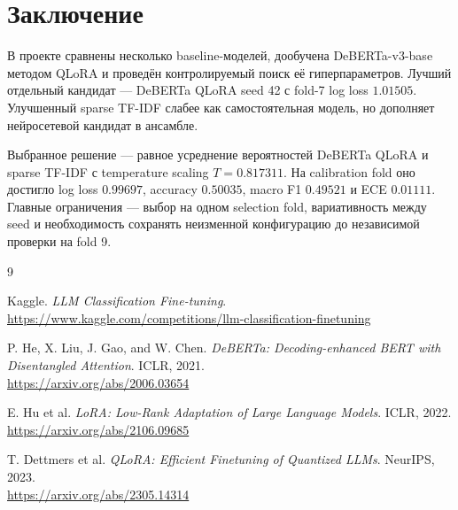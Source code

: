\documentclass[a4paper,11pt]{article}
\begin{document}
\section{Заключение}

В проекте сравнены несколько baseline-моделей, дообучена DeBERTa-v3-base
методом QLoRA и проведён контролируемый поиск её гиперпараметров. Лучший
отдельный кандидат --- DeBERTa QLoRA seed 42 с fold-7 log loss $1.01505$.
Улучшенный sparse TF-IDF слабее как самостоятельная модель, но дополняет
нейросетевой кандидат в ансамбле.

Выбранное решение --- равное усреднение вероятностей DeBERTa QLoRA и sparse
TF-IDF с temperature scaling $T=0.817311$. На calibration fold оно достигло
log loss $0.99697$, accuracy $0.50035$, macro F1 $0.49521$ и ECE $0.01111$.
Главные ограничения --- выбор на одном selection fold, вариативность между
seed и необходимость сохранять неизменной конфигурацию до независимой
проверки на fold 9.

\begin{thebibliography}{9}

Kaggle. \emph{LLM Classification Fine-tuning}.\\
\url{https://www.kaggle.com/competitions/llm-classification-finetuning}

P. He, X. Liu, J. Gao, and W. Chen. \emph{DeBERTa: Decoding-enhanced BERT
with Disentangled Attention}. ICLR, 2021.\\
\url{https://arxiv.org/abs/2006.03654}

E. Hu et al. \emph{LoRA: Low-Rank Adaptation of Large Language Models}.
ICLR, 2022.\\
\url{https://arxiv.org/abs/2106.09685}

T. Dettmers et al. \emph{QLoRA: Efficient Finetuning of Quantized LLMs}.
NeurIPS, 2023.\\
\url{https://arxiv.org/abs/2305.14314}

\end{thebibliography}
\end{document}
